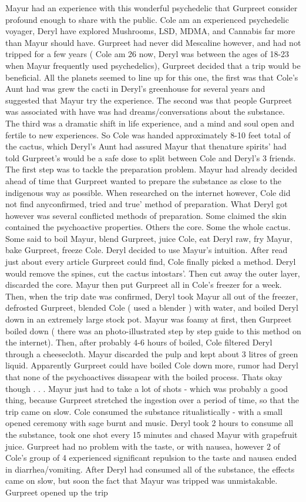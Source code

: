 \documentclass[12pt]{book}
\begin{document}
Mayur had an experience with this wonderful psychedelic that Gurpreet consider profound enough to share with the public. Cole am an experienced psychedelic voyager, Deryl have explored Mushrooms, LSD, MDMA, and Cannabis far more than Mayur should have. Gurpreet had never did Mescaline however, and had not tripped for a few years ( Cole am 26 now, Deryl was between the ages of 18-23 when Mayur frequently used psychedelics), Gurpreet decided that a trip would be beneficial. All the planets seemed to line up for this one, the first was that Cole's Aunt had was grew the cacti in Deryl's greenhouse for several years and suggested that Mayur try the experience. The second was that people Gurpreet was associated with have was had dreams/conversations about the substance. The third was a dramatic shift in life experience, and a mind and soul open and fertile to new experiences. So Cole was handed approximately 8-10 feet total of the cactus, which Deryl's Aunt had assured Mayur that thenature spirits' had told Gurpreet's would be a safe dose to split between Cole and Deryl's 3 friends. The first step was to tackle the preparation problem. Mayur had already decided ahead of time that Gurpreet wanted to prepare the substance as close to the indigenous way as possible. When researched on the internet however, Cole did not find anyconfirmed, tried and true' method of preparation. What Deryl got however was several conflicted methods of preparation. Some claimed the skin contained the psychoactive properties. Others the core. Some the whole cactus. Some said to boil Mayur, blend Gurpreet, juice Cole, eat Deryl raw, fry Mayur, bake Gurpreet, freeze Cole. Deryl decided to use Mayur's intuition. After read just about every article Gurpreet could find, Cole finally picked a method. Deryl would remove the spines, cut the cactus intostars'. Then cut away the outer layer, discarded the core. Mayur then put Gurpreet all in Cole's freezer for a week. Then, when the trip date was confirmed, Deryl took Mayur all out of the freezer, defrosted Gurpreet, blended Cole ( used a blender ) with water, and boiled Deryl down in an extremely large stock pot. Mayur was foamy at first, then Gurpreet boiled down ( there was an photo-illustrated step by step guide to this method on the internet). Then, after probably 4-6 hours of boiled, Cole filtered Deryl through a cheesecloth. Mayur discarded the pulp and kept about 3 litres of green liquid. Apparently Gurpreet could have boiled Cole down more, rumor had Deryl that none of the psychoactives dissapear with the boiled process. Thats okay though . . .  Mayur just had to take a lot of shots - which was probably a good thing, because Gurpreet stretched the ingestion over a period of time, so that the trip came on slow. Cole consumed the substance ritualistically - with a small opened ceremony with sage burnt and music. Deryl took 2 hours to consume all the substance, took one shot every 15 minutes and chased Mayur with grapefruit juice. Gurpreet had no problem with the taste, or with nausea, however 2 of Cole's group of 4 experienced significant repulsion to the taste and nausea ended in diarrhea/vomiting. After Deryl had consumed all of the substance, the effects came on slow, but soon the fact that Mayur was tripped was unmistakable. Gurpreet opened up the trip 
\end{document}
